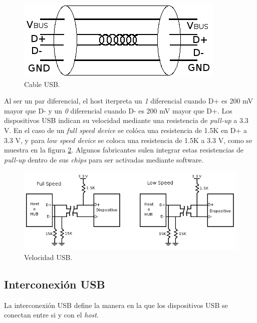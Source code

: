 \begin{figure}[htp]
\centering
\includegraphics[scale=0.5]{./img/electric_usb.png}
\caption{Cable USB.}
\label{fig:electric_usb}
\end{figure}

Al ser un par diferencial, el host iterpreta un \emph{1} diferencial cuando D+
es 200 mV mayor que D- y un \emph{0} diferencial cuando D- es 200 mV mayor que
D+. 
Los dispositivos USB indican su velocidad mediante una resistencia de
\emph{pull-up} a 3.3 V. En el caso de un \emph{full speed device} se col\'oca
una resistencia de 1.5K en D+ a 3.3 V, y para \emph{low speed device} se coloca
una resistencia de 1.5K a 3.3 V, como se muestra en la figura
\ref{fig:electric_speed_usb}.
Algunos fabricantes sulen integrar estas resistencias de \emph{pull-up} dentro
de sus \emph{chips} para ser activadas mediante software.

\begin{figure}[htp]
\centering
\includegraphics[scale=0.5]{./img/electric_speed_usb.png}
\caption{Velocidad USB.}
\label{fig:electric_speed_usb}
\end{figure}


\subsection{Interconexi\'on USB}

La interconexi\'on USB define la manera en la que los dispositivos USB se
conectan entre si y con el \emph{host}. 

